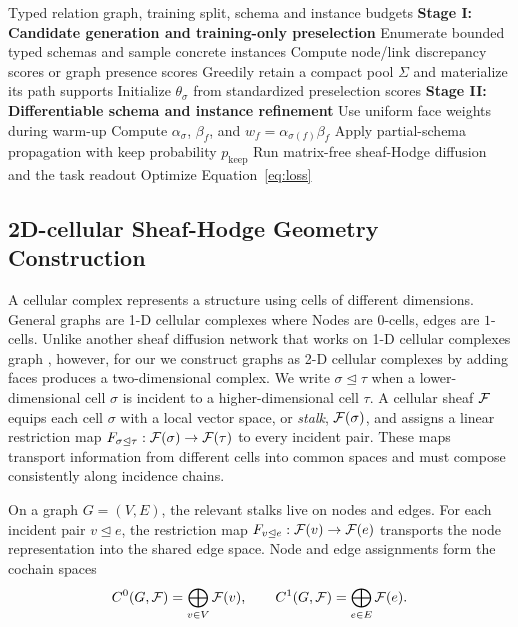 \begin{algorithm}[t]
  \caption{\ampss{} candidate preselection and differentiable refinement}
  \label{alg:ampss}
  \begin{algorithmic}[1]
    \REQUIRE Typed relation graph, training split, schema and instance budgets
    \STATE \textbf{Stage I: Candidate generation and training-only preselection}
    \STATE Enumerate bounded typed schemas and sample concrete instances
    \STATE Compute node/link discrepancy scores or graph presence scores
    \STATE Greedily retain a compact pool \(\Sigma\) and materialize its path supports
    \STATE Initialize \(\theta_\sigma\) from standardized preselection scores
      \STATE \textbf{Stage II: Differentiable schema and instance refinement}
      \STATE Use uniform face weights during warm-up
      \STATE Compute \(\alpha_\sigma\), \(\beta_f\), and \(w_f=\alpha_{\sigma(f)}\beta_f\)
      \STATE Apply partial-schema propagation with keep probability \(p_{\mathrm{keep}}\)
      \STATE Run matrix-free sheaf-Hodge diffusion and the task readout
      \STATE Optimize Equation~\ref{eq:loss}
    \ENDFOR
  \end{algorithmic}
\end{algorithm}

\subsection{2D-cellular Sheaf-Hodge Geometry Construction}

A cellular complex represents a structure using cells of different dimensions. General graphs are 1-D cellular complexes where Nodes are $0$-cells, edges are $1$-cells. Unlike another sheaf diffusion network that works on 1-D cellular complexes graph \cite{bodnar2022neural,braithwaite2024heterogeneous,ribeiro2026cooperative,barbero2022sheaf}, however, for our \method{} we construct graphs as 2-D cellular complexes by adding faces produces a two-dimensional complex. We
write $\sigma\unlhd\tau$ when a lower-dimensional cell $\sigma$ is incident to a
higher-dimensional cell $\tau$. A cellular sheaf $\mathcal{F}$ equips each cell $\sigma$ with a local
vector space, or \emph{stalk}, $\mathcal{F}(\sigma)$, and assigns a linear restriction map
$F_{\sigma\unlhd\tau}:\mathcal{F}(\sigma)\rightarrow\mathcal{F}(\tau)$ to every incident pair. These maps transport
information from different cells into common spaces and must compose consistently along incidence
chains.

On a graph $G=(V,E)$, the relevant stalks live on nodes and edges. For each incident pair
$v\unlhd e$, the restriction map $F_{v\unlhd e}:\mathcal{F}(v)\rightarrow\mathcal{F}(e)$ transports the node
representation into the shared edge space. Node and edge assignments form the cochain spaces
\begin{equation}
  C^0(G,\mathcal{F})=\bigoplus_{v\in V}\mathcal{F}(v),
  \qquad
  C^1(G,\mathcal{F})=\bigoplus_{e\in E}\mathcal{F}(e).
\end{equation}


